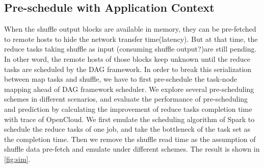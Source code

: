 \subsection{Pre-schedule with Application Context}
When the shuffle output blocks are available in memory, they can be pre-fetched to remote hosts to hide the network transfer time(latency). But at that time, the reduce tasks taking shuffle as input (consuming shuffle output?)are still pending. In other word, the remote hosts of those blocks keep unknown until the reduce tasks are scheduled by the DAG framework. In order to break this serialization between map tasks and shuffle, we have to first pre-schedule the task-node mapping ahead of DAG framework scheduler. We explore several pre-scheduling schemes in different scenarios, and evaluate the performance of pre-scheduling and prediction by calculating the improvement of reduce tasks completion time with trace of OpenCloud\cite{opencloudtrace}. We first emulate the scheduling algorithm of Spark to schedule the reduce tasks of one job, and take the bottleneck of the task set as the completion time. Then we remove the shuffle read time as the assumption of shuffle data pre-fetch and emulate under different schemes. The result is shown in \ref{fig:sim}.
